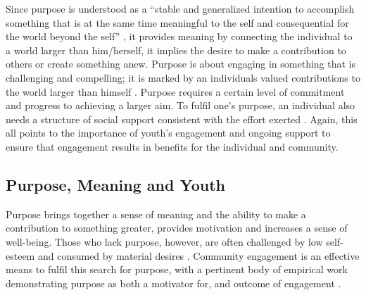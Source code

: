 Since purpose is understood as a “stable and generalized intention to accomplish something that is at the same time meaningful to the self and consequential for the world beyond the self” \citep[][p33]{Damon2003}, it provides meaning by connecting the individual to a world larger than him/herself, it implies the desire to make a contribution to others or create something anew. Purpose is about engaging in something that is challenging and compelling; it is marked by an individuals valued contributions to the world larger than himself \citep{Damon2003}. Purpose requires a certain level of commitment and progress to achieving a larger aim. To fulfil one's purpose, an individual also needs a structure of social support consistent with the effort exerted \citep{Damon2003}. Again, this all points to the importance of youth's engagement and ongoing support to ensure that engagement results in benefits for the individual and community.


\subsection{Purpose, Meaning and Youth} 
\label{Purpose}
Purpose brings together a sense of meaning and the ability to make a contribution to something greater, provides motivation and increases a sense of well-being. Those who lack purpose, however, are often challenged by low self-esteem and consumed by material desires \citep{Damon2003}. Community engagement is an effective means to fulfil this search for purpose, with a pertinent body of empirical work demonstrating purpose as both a motivator for, and outcome of engagement \citep{VanGoethem2012,Youniss1999a,Youniss1999,Hardy2011a}. 


